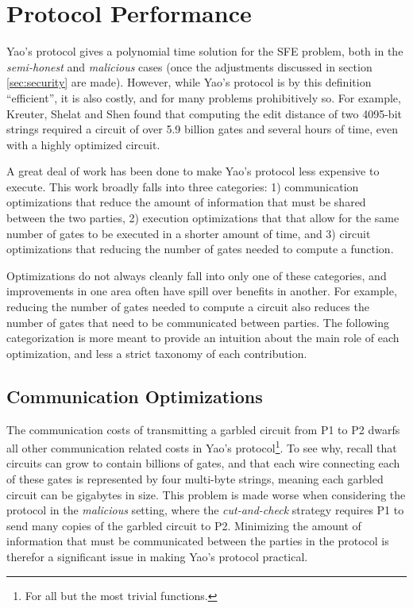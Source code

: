 \section{Protocol Performance}
\label{sec:performance}

Yao's protocol gives a polynomial time solution for the \ac{SFE} problem, both in the \emph{semi-honest} and \emph{malicious} cases (once the adjustments discussed in section \ref{sec:security} are made).  However, while Yao's protocol is by this definition ``efficient'', it is also costly, and for many problems prohibitively so.  For example, Kreuter, Shelat and Shen\cite{kreuter2012billion} found that computing the edit distance of two 4095-bit strings required a circuit of over 5.9 billion gates and several hours of time, even with a highly optimized circuit.

A great deal of work has been done to make Yao's protocol less expensive to execute.  This work broadly falls into three categories: 1) communication optimizations that reduce the amount of information that must be shared between the two parties, 2) execution optimizations that that allow for the same number of gates to be executed in a shorter amount of time, and 3) circuit optimizations that reducing the number of gates needed to compute a function.

Optimizations do not always cleanly fall into only one of these categories, and improvements in one area often have spill over benefits in another.  For example, reducing the number of gates needed to compute a circuit also reduces the number of gates that need to be communicated between parties.  The following categorization is more meant to provide an intuition about the main role of each optimization, and less a strict taxonomy of each contribution.


\subsection{Communication Optimizations}

The communication costs of transmitting a garbled circuit from \ac{P1} to \ac{P2} dwarfs all other communication related costs in Yao's protocol\footnote{For all but the most trivial functions.}.  To see why, recall that circuits can grow to contain billions of gates, and that each wire connecting each of these gates is represented by four multi-byte strings, meaning each garbled circuit can be gigabytes in size. This problem is made worse when considering the protocol in the \emph{malicious} setting, where the \emph{cut-and-check} strategy requires \ac{P1} to send many copies of the garbled circuit to \ac{P2}. Minimizing the amount of information that must be communicated between the parties in the protocol is therefor a significant issue in making Yao's protocol practical.

